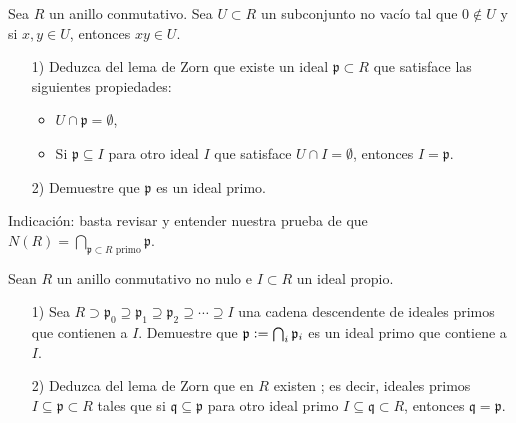 \begin{ejercicio}
  \label{ejerc:primos-sin-interseccion-con-conj-mult}
  Sea $R$ un anillo conmutativo. Sea $U \subset R$ un subconjunto no vacío tal
  que $0 \notin U$ y si $x,y \in U$, entonces $xy \in U$.

  \begin{enumerate}
  \item[1)] Deduzca del lema de Zorn que existe un ideal
    $\mathfrak{p} \subset R$ que satisface las siguientes propiedades:

    \begin{itemize}
    \item $U \cap \mathfrak{p} = \emptyset$,

    \item Si $\mathfrak{p} \subseteq I$ para otro ideal $I$ que satisface
      $U \cap I = \emptyset$, entonces $I = \mathfrak{p}$.
    \end{itemize}

  \item[2)] Demuestre que $\mathfrak{p}$ es un ideal primo.
  \end{enumerate}

  Indicación: basta revisar y entender nuestra prueba de que
  $N (R) = \bigcap_{\mathfrak{p} \subset R\text{ primo}} \mathfrak{p}$.
\end{ejercicio}

\begin{ejercicio}
  Sean $R$ un anillo conmutativo no nulo e $I \subset R$ un ideal propio.

  \begin{enumerate}
  \item[1)] Sea
    $R \supset \mathfrak{p}_0 \supseteq \mathfrak{p}_1 \supseteq
    \mathfrak{p}_2 \supseteq \cdots \supseteq I$ una cadena descendente de
    ideales primos que contienen a $I$. Demuestre que
    $\mathfrak{p} \mathrel{\mathop:}= \bigcap_i \mathfrak{p}_i$ es un ideal primo que contiene
    a $I$.

  \item[2)] Deduzca del lema de Zorn que en $R$ existen ; es decir, ideales primos
    $I \subseteq \mathfrak{p} \subset R$ tales que si
    $\mathfrak{q} \subseteq \mathfrak{p}$ para otro ideal primo
    $I \subseteq \mathfrak{q} \subset R$, entonces
    $\mathfrak{q} = \mathfrak{p}$.
  \end{enumerate}
\end{ejercicio}

